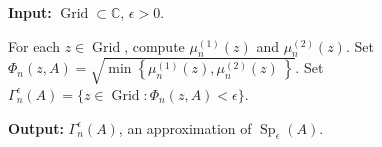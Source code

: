 \begin{algorithm}[ht]
\caption{Colbrook's Algorithm for Computing $\Spe{A}$.}
\label{old pseudospec}

\textbf{Input:} $\operatorname{Grid}\subset\mathbb{C}$, $\epsilon>0$.

\begin{algorithmic}[1]
    \State For each $z\in\operatorname{Grid}$, compute $\mu_n^{(1)}(z)$ and $\mu_n^{(2)}(z).$
    \State Set $\Phi_n(z, A) = \sqrt{ \min \left\{ \mu_n^{(1)}(z), \mu_n^{(2)}(z)\ \right\}}.$
    \State Set
    $\Gamma_n^\epsilon(A)
    =\{z\in\operatorname{Grid}:\Phi_n(z,A)<\epsilon\}$.
\end{algorithmic}

\textbf{Output:} $\Gamma_n^\epsilon(A)$, an approximation of
$\operatorname{Sp}_\epsilon(A)$.

\end{algorithm}
